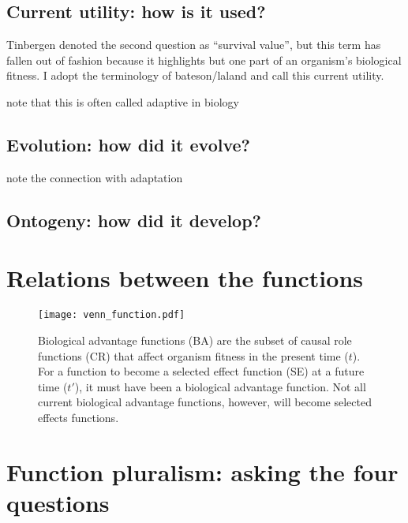 \documentclass{article}
\begin{document}
\subsection{Current utility: how is it used?}

Tinbergen denoted the second question as ``survival value'', but this term has fallen out of fashion because it highlights but one part of an organism's biological fitness.
I adopt the terminology of bateson/laland and call this current utility.

note that this is often called adaptive in biology

\subsection{Evolution: how did it evolve?}
\label{sec:evolution:-how-did}

note the connection with adaptation

\subsection{Ontogeny: how did it develop?}
\label{sec:ontogeny:-how-did}



\section{Relations between the functions}
\label{sec:relat-betw-diff}

\begin{figure}[ht]
  \centering
  \texttt{[image: venn\_function.pdf]}
  \caption[\textbf{Relationship between causal role, biological advantage, and selected effects functions.}
]{Biological advantage functions (BA) are the subset of causal role functions (CR) that affect organism fitness in the present time ($t$). For a function to become a selected effect function (SE) at a future time ($t'$), it must have been a biological advantage function. Not all current biological advantage functions, however, will become selected effects functions.
}
\label{fig:venn}
\end{figure}

\section{Function pluralism: asking the four questions}
\label{sec:funct-plur-asking}
\end{document}
